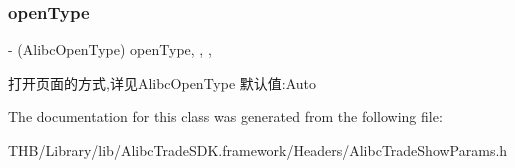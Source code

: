 \subsubsection{\texorpdfstring{open\+Type}{openType}}
{\footnotesize\ttfamily -\/ (Alibc\+Open\+Type) open\+Type\hspace{0.3cm}{\ttfamily [read]}, {\ttfamily [write]}, {\ttfamily [nonatomic]}, {\ttfamily [assign]}}

打开页面的方式,详见\+Alibc\+Open\+Type 默认值\+:Auto 

The documentation for this class was generated from the following file\+:\begin{DoxyCompactItemize}
\item 
T\+H\+B/\+Library/lib/\+Alibc\+Trade\+S\+D\+K.\+framework/\+Headers/Alibc\+Trade\+Show\+Params.\+h\end{DoxyCompactItemize}
